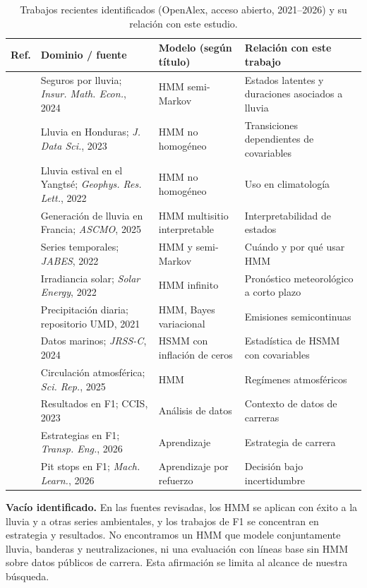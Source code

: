 \documentclass[11pt,letterpaper]{article}
\begin{document}
\begin{table}[ht]
\centering\small
\caption{Trabajos recientes identificados (OpenAlex, acceso abierto, 2021--2026) y su relación con este estudio.}
\label{tab:arte}
\begin{tabular}{p{0.7cm}p{4.2cm}p{3.2cm}p{5.2cm}}
\toprule
Ref. & Dominio / fuente & Modelo (según título) & Relación con este trabajo \\
\midrule
\cite{r1} & Seguros por lluvia; \emph{Insur. Math. Econ.}, 2024 & HMM semi-Markov & Estados latentes y duraciones asociados a lluvia \\
\cite{r2} & Lluvia en Honduras; \emph{J. Data Sci.}, 2023 & HMM no homogéneo & Transiciones dependientes de covariables \\
\cite{r3} & Lluvia estival en el Yangtsé; \emph{Geophys. Res. Lett.}, 2022 & HMM no homogéneo & Uso en climatología \\
\cite{r4} & Generación de lluvia en Francia; \emph{ASCMO}, 2025 & HMM multisitio interpretable & Interpretabilidad de estados \\
\cite{r5} & Series temporales; \emph{JABES}, 2022 & HMM y semi-Markov & Cuándo y por qué usar HMM \\
\cite{r6} & Irradiancia solar; \emph{Solar Energy}, 2022 & HMM infinito & Pronóstico meteorológico a corto plazo \\
\cite{r7} & Precipitación diaria; repositorio UMD, 2021 & HMM, Bayes variacional & Emisiones semicontinuas \\
\cite{r8} & Datos marinos; \emph{JRSS-C}, 2024 & HSMM con inflación de ceros & Estadística de HSMM con covariables \\
\cite{r9} & Circulación atmosférica; \emph{Sci. Rep.}, 2025 & HMM & Regímenes atmosféricos \\
\cite{r10} & Resultados en F1; CCIS, 2023 & Análisis de datos & Contexto de datos de carreras \\
\cite{r11} & Estrategias en F1; \emph{Transp. Eng.}, 2026 & Aprendizaje & Estrategia de carrera \\
\cite{r12} & Pit stops en F1; \emph{Mach. Learn.}, 2026 & Aprendizaje por refuerzo & Decisión bajo incertidumbre \\
\bottomrule
\end{tabular}
\end{table}

\textbf{Vacío identificado.} En las fuentes revisadas, los HMM se aplican con éxito a la lluvia y a otras series ambientales, y los trabajos de F1 se concentran en estrategia y resultados. No encontramos un HMM que modele conjuntamente lluvia, banderas y neutralizaciones, ni una evaluación con líneas base sin HMM sobre datos públicos de carrera. Esta afirmación se limita al alcance de nuestra búsqueda.
\end{document}
